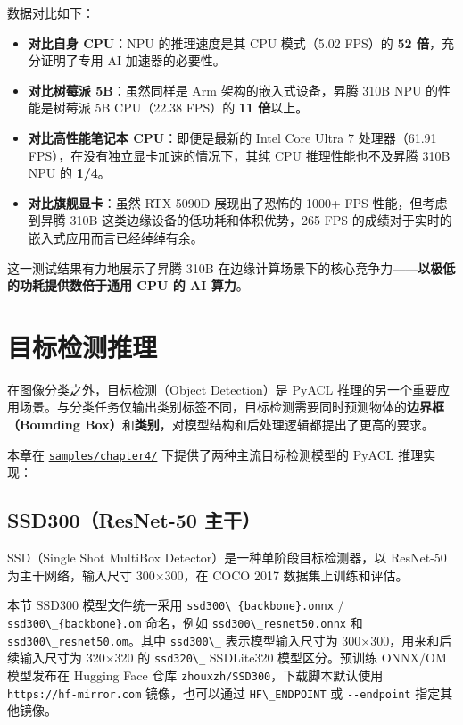 数据对比如下：

\begin{itemize}
\tightlist
\item
  \textbf{对比自身 CPU}：NPU 的推理速度是其 CPU 模式（5.02 FPS）的
  \textbf{52 倍}，充分证明了专用 AI 加速器的必要性。
\item
  \textbf{对比树莓派 5B}：虽然同样是 Arm 架构的嵌入式设备，昇腾 310B NPU
  的性能是树莓派 5B CPU（22.38 FPS）的 \textbf{11 倍}以上。
\item
  \textbf{对比高性能笔记本 CPU}：即便是最新的 Intel Core Ultra 7
  处理器（61.91 FPS），在没有独立显卡加速的情况下，其纯 CPU
  推理性能也不及昇腾 310B NPU 的 \textbf{1/4}。
\item
  \textbf{对比旗舰显卡}：虽然 RTX 5090D 展现出了恐怖的 1000+ FPS
  性能，但考虑到昇腾 310B 这类边缘设备的低功耗和体积优势，265 FPS
  的成绩对于实时的嵌入式应用而言已经绰绰有余。
\end{itemize}

这一测试结果有力地展示了昇腾 310B
在边缘计算场景下的核心竞争力------\textbf{以极低的功耗提供数倍于通用 CPU
的 AI 算力}。

\section{目标检测推理}\label{src-book-chapter4-h31}

在图像分类之外，目标检测（Object Detection）是 PyACL
推理的另一个重要应用场景。与分类任务仅输出类别标签不同，目标检测需要同时预测物体的\textbf{边界框（Bounding
Box）}和\textbf{类别}，对模型结构和后处理逻辑都提出了更高的要求。

本章在
\href{https://github.com/zhouxzh/Ascend310/tree/master/samples/chapter4/}{\passthrough{\lstinline!samples/chapter4/!}}
下提供了两种主流目标检测模型的 PyACL 推理实现：

\subsection{SSD300（ResNet-50 主干）}\label{src-book-chapter4-h32}

SSD（Single Shot MultiBox Detector）是一种单阶段目标检测器，以 ResNet-50
为主干网络，输入尺寸 300×300，在 COCO 2017 数据集上训练和评估。

本节 SSD300 模型文件统一采用
\passthrough{\lstinline!ssd300\_\{backbone\}.onnx!} /
\passthrough{\lstinline!ssd300\_\{backbone\}.om!} 命名，例如
\passthrough{\lstinline!ssd300\_resnet50.onnx!} 和
\passthrough{\lstinline!ssd300\_resnet50.om!}。其中
\passthrough{\lstinline!ssd300\_!} 表示模型输入尺寸为
300×300，用来和后续输入尺寸为 320×320 的
\passthrough{\lstinline!ssd320\_!} SSDLite320 模型区分。预训练 ONNX/OM
模型发布在 Hugging Face 仓库
\passthrough{\lstinline!zhouxzh/SSD300!}，下载脚本默认使用
\passthrough{\lstinline!https://hf-mirror.com!} 镜像，也可以通过
\passthrough{\lstinline!HF\_ENDPOINT!} 或
\passthrough{\lstinline!--endpoint!} 指定其他镜像。

